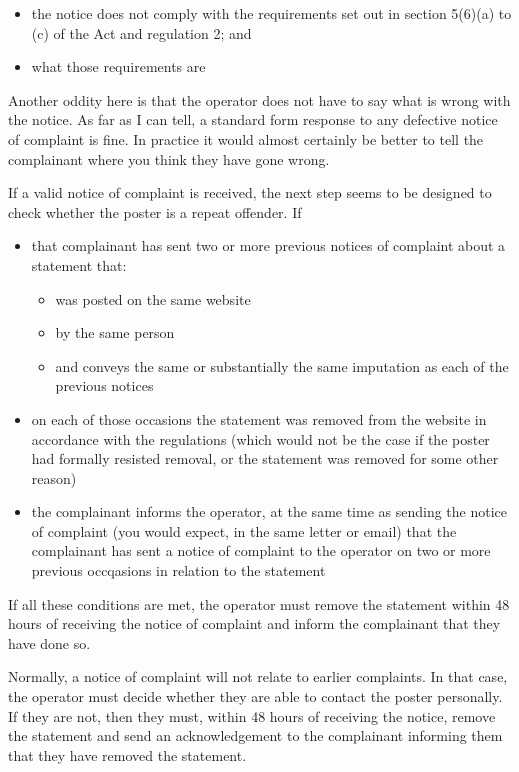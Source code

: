 \documentclass[]{article}
\begin{document}
\begin{itemize}
\item the notice does not comply with the requirements set out in section 5(6)(a) to (c) of the Act and regulation 2; and
\item what those requirements are
\end{itemize}

Another oddity here is that the operator does not have to say what is wrong with the notice. As far as I can tell, a standard form response to any defective notice of complaint is fine. In practice it would almost certainly be better to tell the complainant where you think they have gone wrong.

If a valid notice of complaint is received, the next step seems to be designed to check whether the poster is a repeat offender. If

\begin{itemize}
\item that complainant has sent two or more previous notices of complaint about a statement that:
  \begin{itemize}
  \item was posted on the same website
  \item by the same person
  \item and conveys the same or substantially the same imputation as each of the previous notices
  \end{itemize}
\item on each of those occasions the statement was removed from the website in accordance with the regulations (which would not be the case if the poster had formally resisted removal, or the statement was removed for some other reason)
\item the complainant informs the operator, at the same time as sending the notice of complaint (you would expect, in the same letter or email) that the complainant has sent a notice of complaint to the operator on two or more previous occqasions in relation to the statement
\end{itemize}

If all these conditions are met, the operator must remove the statement within 48 hours of receiving the notice of complaint and inform the complainant that they have done so.

Normally, a notice of complaint will not relate to earlier complaints. In that case, the operator must decide whether they are able to contact the poster personally. If they are not, then they must, within 48 hours of receiving the notice, remove the statement and send an acknowledgement to the complainant informing them that they have removed the statement.
\end{document}
